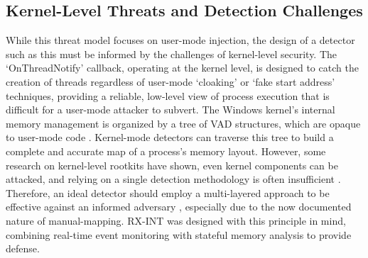 \documentclass[journal]{IEEEtran}
\begin{document}
\subsection{Kernel-Level Threats and Detection Challenges}
While this threat model focuses on user-mode injection, the design of a detector such as this must be informed by the challenges of kernel-level security. The `OnThreadNotify' callback, operating at the kernel level, is designed to catch the creation of threads regardless of user-mode `cloaking' or `fake start address' techniques, providing a reliable, low-level view of process execution that is difficult for a user-mode attacker to subvert. The Windows kernel's internal memory management is organized by a tree of VAD structures, which are opaque to user-mode code \cite{Russinovich2022}. Kernel-mode detectors can traverse this tree to build a complete and accurate map of a process's memory layout. However, some research on kernel-level rootkits have shown, even kernel components can be attacked, and relying on a single detection methodology is often insufficient \cite{kruegel2004detecting} \cite{nadim2023kernellevelrootkitdetectionprevention}. Therefore, an ideal detector should employ a multi-layered approach to be effective against an informed adversary \cite{nistDiD}, especially due to the now documented nature of manual-mapping. RX-INT was designed with this principle in mind, combining real-time event monitoring with stateful memory analysis to provide defense. 
\end{document}
